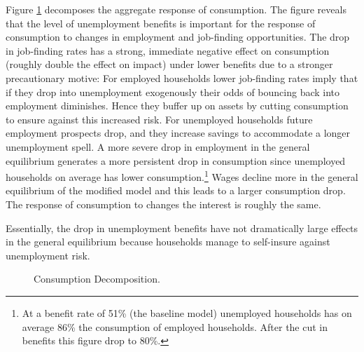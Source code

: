 

Figure \ref{fig:lower_b_C_decomp_G} decomposes the aggregate response of consumption. The figure reveals that the level of unemployment benefits is important for the response of consumption to changes in employment and job-finding opportunities. The drop in job-finding rates has a strong, immediate negative effect on consumption (roughly double the effect on impact) under lower benefits due to a stronger precautionary motive: For employed households lower job-finding rates imply that if they drop into unemployment exogenously their odds of bouncing back into employment diminishes. Hence they buffer up on assets by cutting consumption to ensure against this increased risk. For unemployed households future employment prospects drop, and they increase savings to accommodate a longer unemployment spell. A more severe drop in employment in the general equilibrium generates a more persistent drop in consumption since unemployed households on average has lower consumption.\footnote{At a benefit rate of 51\% (the baseline model) unemployed households has on average 86\% the consumption of employed households. After the cut in benefits this figure drop to 80\%.} Wages decline more in the general equilibrium of the modified model and this leads to a larger consumption drop. The response of consumption to changes the interest is roughly the same. 

Essentially, the drop in unemployment benefits have not dramatically large effects in the general equilibrium because households manage to self-insure against unemployment risk. 

\begin{figure}[H]
\caption[Caption for LOF]{Consumption Decomposition.}
\label{fig:lower_b_C_decomp_G}
\end{figure}




